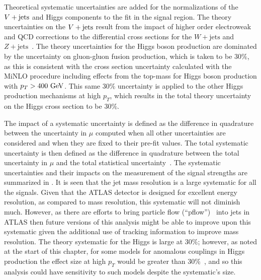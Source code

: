 Theoretical systematic uncertainties are added for the normalizations of the $V + \text{jets}$ and Higgs components to the fit in the signal region.
The theory uncertainties on the $V + \text{jets}$ result from the impact of higher order electroweak and QCD corrections to the differential cross sections for the $W+\mathrm{jets}$ and $Z+\mathrm{jets}$~\cite{Lindert:2017olm}.
The theory uncertainties for the Higgs boson production are dominated by the uncertainty on gluon-gluon fusion production, which is taken to be $30\%$, as this is consistent with the cross section uncertainty calculated with the MiNLO procedure including effects from the top-mass for Higgs boson production with $p_{T}> 400~\mathrm{GeV}$.
This same $30\%$ uncertainty is applied to the other Higgs production mechanisms at high $p_{T}$, which results in the total theory uncertainty on the Higgs cross section to be $30\%$.

The impact of a systematic uncertainty is defined as the difference in quadrature between the uncertainty in $\mu$ computed when all other uncertainties are considered and when they are fixed to their pre-fit values.
The total systematic uncertainty is then defined as the difference in quadrature between the total uncertainty in $\mu$ and the total statistical uncertainty~\cite{ATLAS-CONF-2018-052}.
The systematic uncertainties and their impacts on the measurement of the signal strengths are summarized in .
It is seen that the jet mass resolution is a large systematic for all the signals.
Given that the ATLAS detector is designed for excellent energy resolution, as compared to mass resolution, this systematic will not diminish much.
However, as there are efforts to bring particle flow (``pflow'')~\cite{PERF-2015-09} into \largeR{} jets in ATLAS then future versions of this analysis might be able to improve upon this systematic given the additional use of tracking information to improve mass resolution.
The theory systematic for the Higgs is large at $30\%$; however, as noted at the start of this chapter, for some models for anomalous couplings in Higgs production the effect size at high $p_{T}$ would be greater than $30\%$~\cite{Grojean:2013nya,Dawson:2015gka}, and so this analysis could have sensitivity to such models despite the systematic's size.

